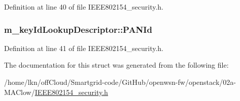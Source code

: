 Definition at line 40 of file I\+E\+E\+E802154\+\_\+security.\+h.

\subsubsection[{\texorpdfstring{P\+A\+N\+Id}{PANId}}]{ m\+\_\+key\+Id\+Lookup\+Descriptor\+::\+P\+A\+N\+Id}\hypertarget{structm__key_id_lookup_descriptor_a0de84585a2981ce7dfe61ca5618d382b}{}\label{structm__key_id_lookup_descriptor_a0de84585a2981ce7dfe61ca5618d382b}


Definition at line 41 of file I\+E\+E\+E802154\+\_\+security.\+h.



The documentation for this struct was generated from the following file\+:\begin{DoxyCompactItemize}
\item 
/home/lkn/off\+Cloud/\+Smartgrid-\/code/\+Git\+Hub/openwsn-\/fw/openstack/02a-\/\+M\+A\+Clow/\hyperlink{_i_e_e_e802154__security_8h}{I\+E\+E\+E802154\+\_\+security.\+h}\end{DoxyCompactItemize}
